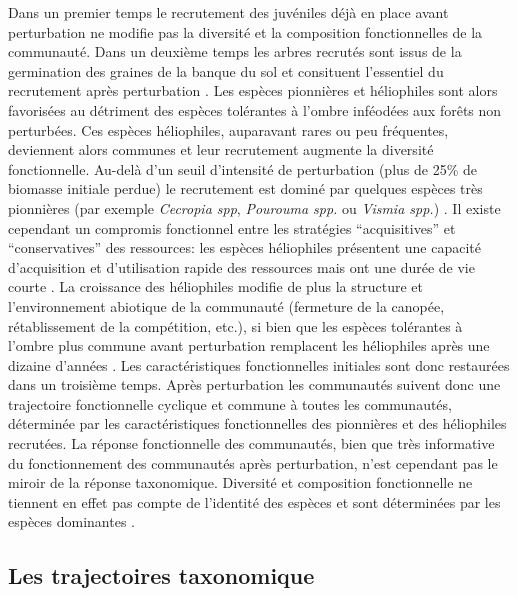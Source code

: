 \documentclass[
  11pt,
  french,
  A4paper,
  extrafontsizes,onecolumn,openright
  ]{memoir}
\begin{document}
Dans un premier temps le recrutement des juvéniles déjà en place avant
perturbation ne modifie pas la diversité et la composition
fonctionnelles de la communauté. Dans un deuxième temps les arbres
recrutés sont issus de la germination des graines de la banque du sol et
consituent l'essentiel du recrutement après perturbation
\autocite{Lawton1988}. Les espèces pionnières et héliophiles sont alors
favorisées au détriment des espèces tolérantes à l'ombre inféodées aux
forêts non perturbées. Ces espèces héliophiles, auparavant rares ou peu
fréquentes, deviennent alors communes et leur recrutement augmente la
diversité fonctionnelle. Au-delà d'un seuil d'intensité de perturbation
(plus de 25\% de biomasse initiale perdue) le recrutement est dominé par
quelques espèces très pionnières (par exemple \emph{Cecropia spp},
\emph{Pourouma spp.} ou \emph{Vismia spp.}) \autocite{Guitet2018}. Il
existe cependant un compromis fonctionnel entre les stratégies
``acquisitives'' et ``conservatives'' des ressources: les espèces
héliophiles présentent une capacité d'acquisition et d'utilisation
rapide des ressources mais ont une durée de vie courte
\autocite{Falster2011}. La croissance des héliophiles modifie de plus la
structure et l'environnement abiotique de la communauté (fermeture de la
canopée, rétablissement de la compétition, etc.), si bien que les
espèces tolérantes à l'ombre plus commune avant perturbation remplacent
les héliophiles après une dizaine d'années \autocite{Denslow2000}. Les
caractéristiques fonctionnelles initiales sont donc restaurées dans un
troisième temps. Après perturbation les communautés suivent donc une
trajectoire fonctionnelle cyclique et commune à toutes les communautés,
déterminée par les caractéristiques fonctionnelles des pionnières et des
héliophiles recrutées. La réponse fonctionnelle des communautés, bien
que très informative du fonctionnement des communautés après
perturbation, n'est cependant pas le miroir de la réponse taxonomique.
Diversité et composition fonctionnelle ne tiennent en effet pas compte
de l'identité des espèces et sont déterminées par les espèces dominantes
\autocites{Grime1998}{Lavorel2002}.

\subsection{Les trajectoires
taxonomique}\label{les-trajectoires-taxonomique}
\end{document}
